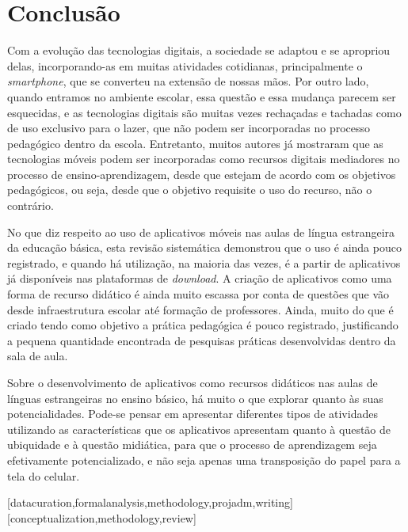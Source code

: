 \documentclass{textolivre}
\begin{document}
\section{Conclusão}
Com a evolução das tecnologias digitais, a sociedade se adaptou e se apropriou delas, incorporando-as em muitas atividades cotidianas, principalmente o \emph{smartphone}, que se converteu na extensão de nossas mãos. Por outro lado, quando entramos no ambiente escolar, essa questão e essa mudança parecem ser esquecidas, e as tecnologias digitais são muitas vezes rechaçadas e tachadas como de uso exclusivo para o lazer, que não podem ser incorporadas no processo pedagógico dentro da escola. Entretanto, muitos autores \cite{bannell2016, gardner2014, karsenti2014, perezgomez2012, saccol2011, unesco} já mostraram que as tecnologias móveis podem ser incorporadas como recursos digitais mediadores no processo de ensino-aprendizagem, desde que estejam de acordo com os objetivos pedagógicos, ou seja, desde que o objetivo requisite o uso do recurso, não o contrário. 

No que diz respeito ao uso de aplicativos móveis nas aulas de língua estrangeira da educação básica, esta revisão sistemática demonstrou que o uso é ainda pouco registrado, e quando há utilização, na maioria das vezes, é a partir de aplicativos já disponíveis nas plataformas de \emph{download}. A criação de aplicativos como uma forma de recurso didático é ainda muito escassa por conta de questões que vão desde infraestrutura escolar até formação de professores.  Ainda, muito do que é criado tendo como objetivo a prática pedagógica é pouco registrado, justificando a pequena quantidade encontrada de pesquisas práticas desenvolvidas dentro da sala de aula.

Sobre o desenvolvimento de aplicativos como recursos didáticos nas aulas de línguas estrangeiras no ensino básico, há muito o que explorar quanto às suas potencialidades. Pode-se pensar em apresentar diferentes tipos de atividades utilizando as características que os aplicativos apresentam quanto à questão de ubiquidade e à questão midiática, para que o processo de aprendizagem seja efetivamente potencializado, e não seja apenas uma transposição do papel para a tela do celular. 



\printbibliography\label{sec-bib}

\begin{contributors}
[datacuration,formalanalysis,methodology,projadm,writing]
[conceptualization,methodology,review]
\end{contributors}
\end{document}
